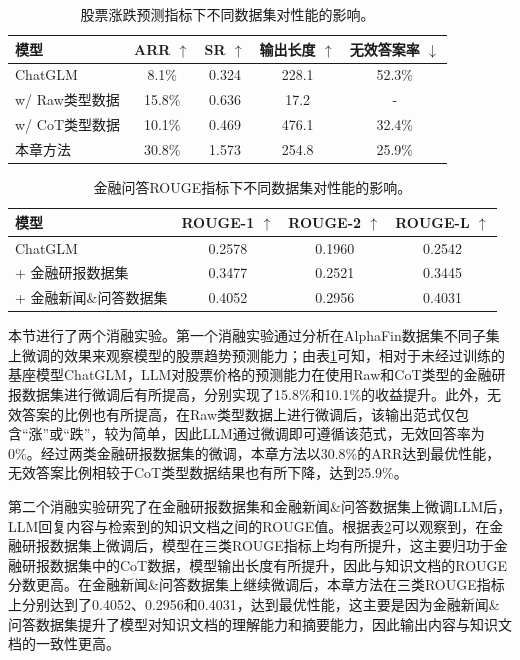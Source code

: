 \begin{table}
	\caption{\label{dataset_ablation_trend}股票涨跌预测指标下不同数据集对性能的影响。}
	\centering{}%
	\small 
	\begin{tabular}{lcccc}
		\toprule[2pt]
		模型 & ARR $\uparrow$ & SR $\uparrow$ & 输出长度 $\uparrow$ & 无效答案率 $\downarrow$ \\
		\hline
		ChatGLM & 8.1\% & 0.324 & 228.1 & 52.3\% \\
		w/ Raw类型数据 & 15.8\% & 0.636 & 17.2 & - \\
		w/ CoT类型数据 & 10.1\% & 0.469 & 476.1 & 32.4\% \\
		本章方法 & 30.8\% & 1.573 & 254.8 & 25.9\% \\
		\bottomrule[2pt]
	\end{tabular}
\end{table}

\begin{table}
	\caption{\label{dataset_ablation_qa}金融问答ROUGE指标下不同数据集对性能的影响。}
	\centering{}%
	\small 
	\begin{tabular}{lccc}
		\toprule[2pt]
		模型 & ROUGE-1 $\uparrow$ & ROUGE-2 $\uparrow$ & ROUGE-L $\uparrow$ \\
		\hline
		ChatGLM & 0.2578 & 0.1960 & 0.2542 \\
		+ 金融研报数据集 & 0.3477 & 0.2521 & 0.3445 \\
		+ 金融新闻\&问答数据集 & 0.4052 & 0.2956 & 0.4031 \\
		\bottomrule[2pt]
	\end{tabular}
\end{table}

本节进行了两个消融实验。第一个消融实验通过分析在AlphaFin数据集不同子集上微调的效果来观察模型的股票趋势预测能力；由表\ref{dataset_ablation_trend}可知，相对于未经过训练的基座模型ChatGLM，LLM对股票价格的预测能力在使用Raw和CoT类型的金融研报数据集进行微调后有所提高，分别实现了15.8\%和10.1\%的收益提升。此外，无效答案的比例也有所提高，在Raw类型数据上进行微调后，该输出范式仅包含“涨”或“跌”，较为简单，因此LLM通过微调即可遵循该范式，无效回答率为0\%。经过两类金融研报数据集的微调，本章方法以30.8\%的ARR达到最优性能，无效答案比例相较于CoT类型数据结果也有所下降，达到25.9\%。

第二个消融实验研究了在金融研报数据集和金融新闻\&问答数据集上微调LLM后，LLM回复内容与检索到的知识文档之间的ROUGE值。根据表\ref{dataset_ablation_qa}可以观察到，在金融研报数据集上微调后，模型在三类ROUGE指标上均有所提升，这主要归功于金融研报数据集中的CoT数据，模型输出长度有所提升，因此与知识文档的ROUGE分数更高。在金融新闻\&问答数据集上继续微调后，本章方法在三类ROUGE指标上分别达到了0.4052、0.2956和0.4031，达到最优性能，这主要是因为金融新闻\&问答数据集提升了模型对知识文档的理解能力和摘要能力，因此输出内容与知识文档的一致性更高。


